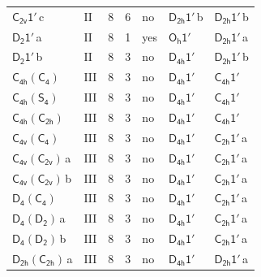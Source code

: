 \documentclass[10pt,a4paper]{article}
\numberwithin{equation}{section}
\newcommand{\grp}[1]{\mathsf{#1}}
\newcommand{\clsletter}[1]{\,{\scriptsize\color{black!55}#1}}
\begin{document}
{\begin{longtable}{@{}llrrlll@{}}
\href{C2v-1p.pdf}{$\grp{C_{2v}1'}$}\clsletter{c} & II & 8 & 6 & no & \href{D2h-1p.pdf}{$\grp{D_{2h}1'}$}\clsletter{b} & \href{D2h-1p.pdf}{$\grp{D_{2h}1'}$}\clsletter{b}\\
\href{D2-1p.pdf}{$\grp{D_{2}1'}$}\clsletter{a} & II & 8 & 1 & yes & \href{Oh-1p.pdf}{$\grp{O_{h}1'}$} & \href{D2h-1p.pdf}{$\grp{D_{2h}1'}$}\clsletter{a}\\
\href{D2-1p.pdf}{$\grp{D_{2}1'}$}\clsletter{b} & II & 8 & 3 & no & \href{D4h-1p.pdf}{$\grp{D_{4h}1'}$} & \href{D2h-1p.pdf}{$\grp{D_{2h}1'}$}\clsletter{b}\\
\href{C4h-C4.pdf}{$\grp{C_{4h}}(\grp{C_{4}})$} & III & 8 & 3 & no & \href{D4h-1p.pdf}{$\grp{D_{4h}1'}$} & \href{C4h-1p.pdf}{$\grp{C_{4h}1'}$}\\
\href{C4h-S4.pdf}{$\grp{C_{4h}}(\grp{S_{4}})$} & III & 8 & 3 & no & \href{D4h-1p.pdf}{$\grp{D_{4h}1'}$} & \href{C4h-1p.pdf}{$\grp{C_{4h}1'}$}\\
\href{C4h-C2h.pdf}{$\grp{C_{4h}}(\grp{C_{2h}})$} & III & 8 & 3 & no & \href{D4h-1p.pdf}{$\grp{D_{4h}1'}$} & \href{C4h-1p.pdf}{$\grp{C_{4h}1'}$}\\
\href{C4v-C4.pdf}{$\grp{C_{4v}}(\grp{C_{4}})$} & III & 8 & 3 & no & \href{D4h-1p.pdf}{$\grp{D_{4h}1'}$} & \href{C2h-1p.pdf}{$\grp{C_{2h}1'}$}\clsletter{a}\\
\href{C4v-C2v.pdf}{$\grp{C_{4v}}(\grp{C_{2v}})$}\clsletter{a} & III & 8 & 3 & no & \href{D4h-1p.pdf}{$\grp{D_{4h}1'}$} & \href{C2h-1p.pdf}{$\grp{C_{2h}1'}$}\clsletter{a}\\
\href{C4v-C2v.pdf}{$\grp{C_{4v}}(\grp{C_{2v}})$}\clsletter{b} & III & 8 & 3 & no & \href{D4h-1p.pdf}{$\grp{D_{4h}1'}$} & \href{C2h-1p.pdf}{$\grp{C_{2h}1'}$}\clsletter{a}\\
\href{D4-C4.pdf}{$\grp{D_{4}}(\grp{C_{4}})$} & III & 8 & 3 & no & \href{D4h-1p.pdf}{$\grp{D_{4h}1'}$} & \href{C2h-1p.pdf}{$\grp{C_{2h}1'}$}\clsletter{a}\\
\href{D4-D2.pdf}{$\grp{D_{4}}(\grp{D_{2}})$}\clsletter{a} & III & 8 & 3 & no & \href{D4h-1p.pdf}{$\grp{D_{4h}1'}$} & \href{C2h-1p.pdf}{$\grp{C_{2h}1'}$}\clsletter{a}\\
\href{D4-D2.pdf}{$\grp{D_{4}}(\grp{D_{2}})$}\clsletter{b} & III & 8 & 3 & no & \href{D4h-1p.pdf}{$\grp{D_{4h}1'}$} & \href{C2h-1p.pdf}{$\grp{C_{2h}1'}$}\clsletter{a}\\
\href{D2h-C2h.pdf}{$\grp{D_{2h}}(\grp{C_{2h}})$}\clsletter{a} & III & 8 & 3 & no & \href{D4h-1p.pdf}{$\grp{D_{4h}1'}$} & \href{D2h-1p.pdf}{$\grp{D_{2h}1'}$}\clsletter{a}\\

\end{longtable}}
\end{document}

